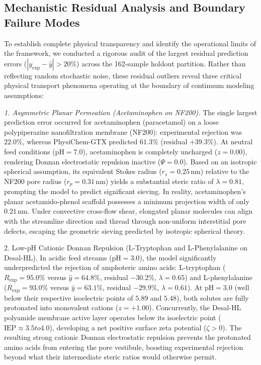 \documentclass[11pt]{article}
\begin{document}
\subsection{Mechanistic Residual Analysis and Boundary Failure Modes}
\label{subsec:outliers}

To establish complete physical transparency and identify the operational limits of the framework, we conducted a rigorous audit of the largest residual prediction errors ($|y_{\mathrm{exp}} - \hat{y}| > 20\%$) across the 162-sample holdout partition. Rather than reflecting random stochastic noise, these residual outliers reveal three critical physical transport phenomena operating at the boundary of continuum modeling assumptions:

\textit{1. Asymmetric Planar Permeation (Acetaminophen on NF200).} The single largest prediction error occurred for acetaminophen (paracetamol) on a loose polypiperazine nanofiltration membrane (NF200): experimental rejection was $22.0\%$, whereas PhysiChem-GTX predicted $61.3\%$ (residual $+39.3\%$). At neutral feed conditions ($\mathrm{pH} = 7.0$), acetaminophen is completely uncharged ($z = 0.00$), rendering Donnan electrostatic repulsion inactive ($\Psi = 0.0$). Based on an isotropic spherical assumption, its equivalent Stokes radius ($r_s = 0.25\,\mathrm{nm}$) relative to the NF200 pore radius ($r_p = 0.31\,\mathrm{nm}$) yields a substantial steric ratio of $\lambda = 0.81$, prompting the model to predict significant sieving. In reality, acetaminophen's planar acetamido-phenol scaffold possesses a minimum projection width of only $0.21\,\mathrm{nm}$. Under convective cross-flow shear, elongated planar molecules can align with the streamline direction and thread through non-uniform interstitial pore defects, escaping the geometric sieving predicted by isotropic spherical theory.

2. Low-pH Cationic Donnan Repulsion (L-Tryptophan and L-Phenylalanine on Desal-HL). In acidic feed streams ($\mathrm{pH} = 3.0$), the model significantly underpredicted the rejection of amphoteric amino acids: L-tryptophan ($R_{\mathrm{exp}} = 95.0\%$ versus $\hat{y} = 64.8\%$, residual $-30.2\%$, $\lambda = 0.65$) and L-phenylalanine ($R_{\mathrm{exp}} = 93.0\%$ versus $\hat{y} = 63.1\%$, residual $-29.9\%$, $\lambda = 0.61$). At $\mathrm{pH} = 3.0$ (well below their respective isoelectric points of $5.89$ and $5.48$), both solutes are fully protonated into monovalent cations ($z = +1.00$). Concurrently, the Desal-HL polyamide membrane active layer operates below its isoelectric point ($\mathrm{IEP} \approx 3.5 to 4.0$), developing a net positive surface zeta potential ($\zeta > 0$). The resulting strong cationic Donnan electrostatic repulsion prevents the protonated amino acids from entering the pore vestibule, boosting experimental rejection beyond what their intermediate steric ratios would otherwise permit.
\end{document}
